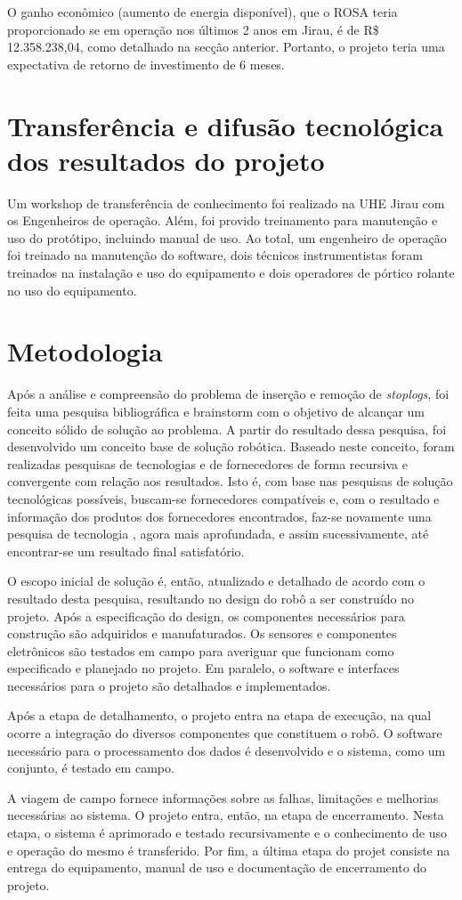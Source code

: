 O ganho econômico (aumento de energia disponível), que o ROSA teria
proporcionado se em operação nos últimos 2 anos em Jirau, é de R\$
12.358.238,04, como detalhado na secção anterior. Portanto, o projeto teria uma
expectativa de retorno de investimento de 6 meses.

\section{Transferência e difusão tecnológica dos resultados do projeto}
Um workshop de transferência de conhecimento foi realizado na UHE Jirau com os
Engenheiros de operação. Além, foi provido treinamento para manutenção e uso do 
protótipo, incluindo manual de uso. Ao total, um engenheiro de operação foi 
treinado na manutenção do software, dois técnicos instrumentistas foram treinados 
na instalação e uso do equipamento e dois operadores de pórtico rolante no uso 
do equipamento.

\section{Metodologia}

Após a análise e compreensão do problema de inserção e remoção de
\textit{stoplogs}, foi feita uma pesquisa bibliográfica e brainstorm com o
objetivo de alcançar um conceito sólido de solução ao problema. A partir do
resultado dessa pesquisa, foi desenvolvido um conceito base de solução robótica. 
Baseado neste conceito, foram realizadas pesquisas de tecnologias e de fornecedores 
de forma recursiva e convergente com relação aos resultados. Isto é, com base
nas pesquisas de solução tecnológicas possíveis, buscam-se fornecedores
compatíveis e, com o resultado e informação dos produtos dos fornecedores
encontrados, faz-se novamente uma pesquisa de tecnologia , agora mais
aprofundada, e assim sucessivamente, até encontrar-se um resultado final
satisfatório.

O escopo inicial de solução é, então, atualizado e detalhado de acordo com o 
resultado desta pesquisa, resultando no design do robô a ser construído no projeto. 
Após a especificação do design, os componentes necessários para construção são
adquiridos e manufaturados. Os sensores e componentes eletrônicos são testados
em campo para averiguar que funcionam como especificado e planejado no
projeto. Em paralelo, o software e interfaces necessários para o projeto são 
detalhados e implementados.  

Após a etapa de detalhamento, o projeto entra na etapa de execução, na qual
ocorre a integração do diversos componentes que constituem o robô.
O software necessário para o processamento dos dados é desenvolvido e o
sistema, como um conjunto, é testado em campo. 

A viagem de campo fornece informações sobre as falhas, limitações e melhorias 
necessárias ao sistema. O projeto entra, então, na etapa de encerramento. Nesta 
etapa, o sistema é aprimorado e testado recursivamente e o conhecimento de uso e 
operação do mesmo é transferido. Por fim, a última etapa do projet consiste na
entrega do equipamento, manual de uso e documentação de encerramento do projeto.



